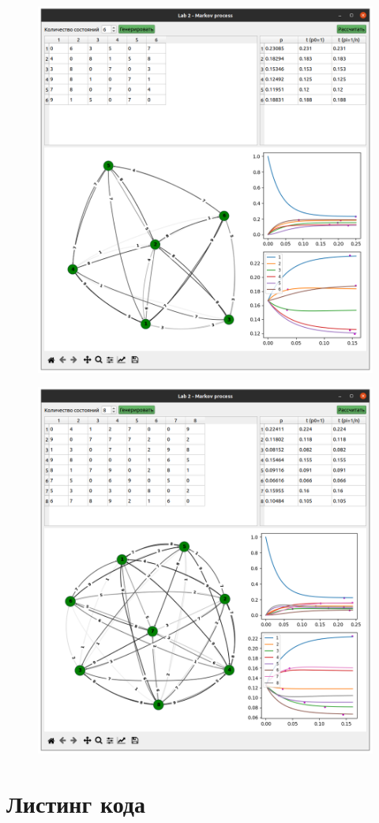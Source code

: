 \begin{figure}[h!]
    \includegraphics[width=\textwidth]{2/6}
\end{figure}
\begin{figure}[h!]
    \includegraphics[width=\textwidth]{2/8}
\end{figure}


\clearpage
\section{Листинг кода}


